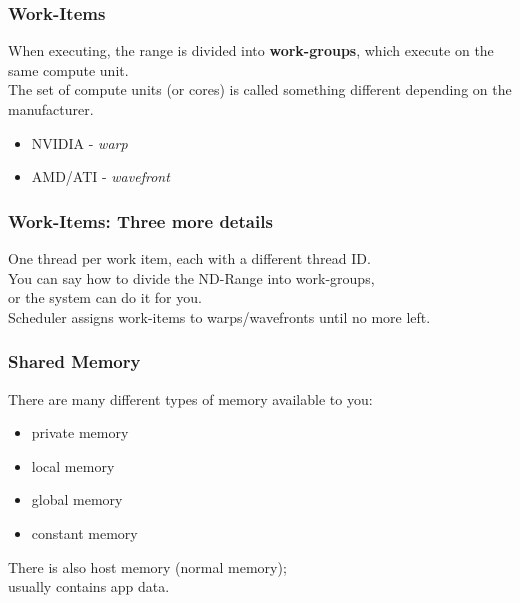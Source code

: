 \begin{frame}
\frametitle{Work-Items}
    
    When executing, the range is divided into {\bf work-groups}, which
      execute on the same compute unit.\\[1em]

    The set of compute units (or cores) is called something different
          depending on the manufacturer.
          \begin{itemize}
            \item NVIDIA - {\it warp}
            \item AMD/ATI - {\it wavefront}
          \end{itemize}

\end{frame}

\begin{frame}
  \frametitle{Work-Items: Three more details}


  One thread per work item, each with a different thread ID.\\[1em]

  You can say how to divide the ND-Range into work-groups, \\
  or the system can do it for you.\\[1em]

  Scheduler assigns work-items to warps/wavefronts until no more left.


\end{frame}

\begin{frame}
  \frametitle{Shared Memory}


  There are many different types of memory available to you:


\begin{itemize}
\item private memory
\item local memory
\item global memory
\item constant memory
\end{itemize}

There is also host memory (normal memory);\\ usually contains app data.

\end{frame}

